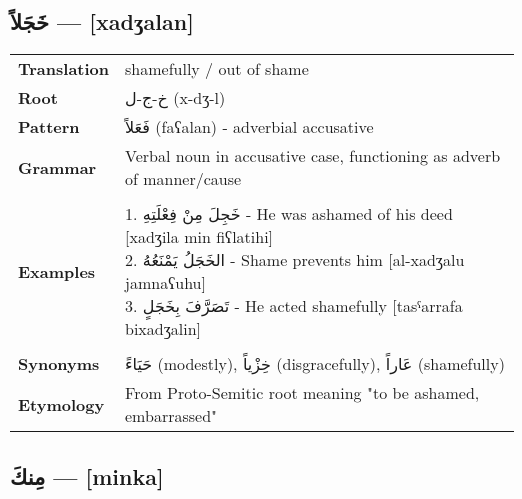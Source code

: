 \documentclass[letterpaper,12pt]{article}
\begin{document}
\subsection{\textarabic{خَجَلاً} — [xadʒalan]}

\begin{tabular}{p{3cm}p{10cm}}
\toprule
\textbf{Translation} & shamefully / out of shame \\
\textbf{Root} & \textarabic{خ-ج-ل} (x-dʒ-l) \\
\textbf{Pattern} & \textarabic{فَعَلاً} (faʕalan) - adverbial accusative \\
\textbf{Grammar} & Verbal noun in accusative case, functioning as adverb of manner/cause \\
\midrule \\
\textbf{Examples} & \makecell[l]{\parbox{9.5cm}{
1. \textarabic{خَجِلَ مِنْ فِعْلَتِهِ} - He was ashamed of his deed [xadʒila min fiʕlatihi]\\
2. \textarabic{الخَجَلُ يَمْنَعُهُ} - Shame prevents him [al-xadʒalu jamnaʕuhu]\\
3. \textarabic{تَصَرَّفَ بِخَجَلٍ} - He acted shamefully [tasˤarrafa bixadʒalin]
}} \\
\midrule \\
\textbf{Synonyms} & \textarabic{حَيَاءً} (modestly), \textarabic{خِزْياً} (disgracefully), \textarabic{عَاراً} (shamefully) \\
\textbf{Etymology} & From Proto-Semitic root meaning "to be ashamed, embarrassed" \\
\bottomrule

\end{tabular}

\subsection{\textarabic{مِنكَ} — [minka]}
\end{document}
